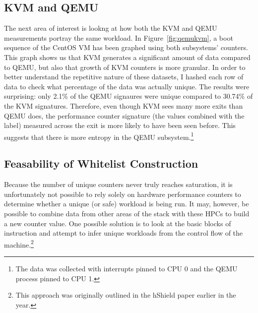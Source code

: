 \documentclass[notitlepage]{article}
\begin{document}
\subsection{KVM and QEMU}
The next area of interest is lookng at how both the KVM and QEMU measurements
portray the same workload. In Figure~\ref{fig:qemukvm}, a boot sequence of the
CentOS VM has been graphed using both subsystems' counters. This graph shows us
that KVM generates a significant amount of data compared to QEMU, but also that
growth of KVM counters is more granular. In order to better understand the
repetitive nature of these datasets, I hashed each row of data to check what
percentage of the data was actually unique. The results were surprising: only
2.1\% of the QEMU signaures were unique compared to 30.74\% of the KVM
signatures. Therefore, even though KVM sees many more exits than QEMU does, the
performance counter signature (the values combined with the label) measured
across the exit is more likely to have been seen before. This suggests that
there is more entropy in the QEMU subsystem.\footnote{The data was collected with
    interrupts pinned to CPU 0 and the QEMU process pinned to CPU 1.}

\subsection{Feasability of Whitelist Construction}
Because the number of unique counters never truly reaches saturation, it is
unfortunately not possible to rely solely on hardware performance counters to
determine whether a unique (or safe) workload is being run. It may, however, be
possible to combine data from other areas of the stack with these HPCs to build
a new counter value. One possible solution is to look at the basic blocks of
instruction and attempt to infer unique workloads from the control flow of the
machine.\footnote{This approach was
originally outlined in the hShield paper earlier in the year.}
\end{document}
